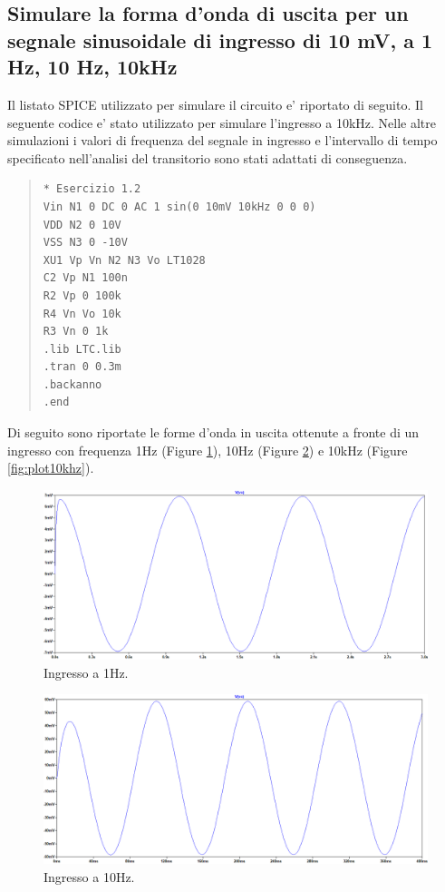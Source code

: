 \documentclass[a4paper,10pt]{article}
\begin{document}
\subsection{Simulare la forma d'onda di uscita per un segnale sinusoidale di ingresso di 10 mV, a 1 Hz, 10 Hz, 10kHz}
Il listato SPICE utilizzato per simulare il circuito e' riportato di seguito. Il seguente codice e' stato utilizzato per simulare l'ingresso a 10kHz. Nelle altre simulazioni i valori di frequenza del segnale in ingresso e l'intervallo di tempo specificato nell'analisi del transitorio sono stati adattati di conseguenza.
\begin{quote}
\begin{verbatim}
* Esercizio 1.2
Vin N1 0 DC 0 AC 1 sin(0 10mV 10kHz 0 0 0)
VDD N2 0 10V
VSS N3 0 -10V
XU1 Vp Vn N2 N3 Vo LT1028
C2 Vp N1 100n
R2 Vp 0 100k
R4 Vn Vo 10k
R3 Vn 0 1k
.lib LTC.lib
.tran 0 0.3m
.backanno
.end
\end{verbatim}
\end{quote}
Di seguito sono riportate le forme d'onda in uscita ottenute a fronte di un ingresso con frequenza 1Hz (Figure \ref{fig:plot1hz}), 10Hz (Figure \ref{fig:plot10hz}) e 10kHz (Figure \ref{fig:plot10khz}).

\begin{figure}[h!]
	\centering
 	\includegraphics[width=0.8\linewidth]{plot1-2-1.png}
  	\caption{Ingresso a 1Hz.}
  	\label{fig:plot1hz}
\end{figure}

\begin{figure}[h!]
	\centering
 	\includegraphics[width=0.8\linewidth]{plot1-2-2.png}
  	\caption{Ingresso a 10Hz.}
  	\label{fig:plot10hz}
\end{figure}
\end{document}
